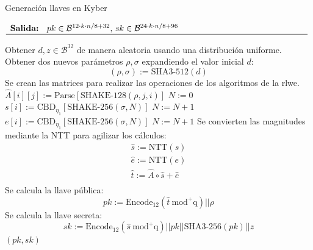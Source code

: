 \begin{algorithm}[H]
	\caption{Generación llaves en Kyber}
	$\begin{array}{p{\textwidth}}
		\textbf{Salida: } \(pk\in \mathcal{B}^{12\cdot k\cdot n/8+32}\), \(sk\in \mathcal{B}^{24\cdot k\cdot n/8+96}\) \\ 
		\hline
	\end{array}$
	\begin{algorithmic}[1]
		\State Obtener \(d, z\in\mathcal{B}^{32}\) de manera aleatoria usando una distribución uniforme.
		\State Obtener dos nuevos parámetros \(\rho, \sigma\) expandiendo el valor inicial \(d\):
		\begin{equation}
			(\rho, \sigma):=\text{SHA3-512}(d)
		\end{equation}
		\Statex Se crean las matrices para realizar las operaciones de los algoritmos de la  \acrshort{rlwe}.
				\State $\hat{A}[i][j]:=\text{Parse}[\text{SHAKE-128}(\rho,j,i)]$ 
			\EndFor
		\EndFor
		\State $N:=0$
			\State $s[i]:= \text{CBD}_{\eta_1}[\text{SHAKE-256}(\sigma,N)]$ 
			\State $N:= N+1$
		\EndFor
			\State $e[i]:= \text{CBD}_{\eta_1}[\text{SHAKE-256}(\sigma,N)]$ 
			\State $N:= N+1$
		\EndFor
		\State Se convierten las magnitudes mediante la NTT para agilizar los cálculos:
		\begin{equation}
				\begin{array}{l}
					\hat{s}:=\text{NTT}(s)\\
					\hat{e}:=\text{NTT}(e)\\
					\hat{t}:=\hat{A}\circ\hat{s}+\hat{e}\\
				\end{array} 	
		\end{equation}
		\State Se calcula la llave pública:
		\begin{equation}
			pk:=\text{Encode}_{12}(\hat{t}\ \text{mod}^{+}\text{q} )||\rho 
		\end{equation}
		\Statex {}
		\Statex {}
		\State Se calcula la llave secreta:
		\begin{equation}
			sk:=\text{Encode}_{12}(\hat{s}\ \text{mod}^{+}\text{q} )||pk||\text{SHA3-256}(pk)||z
		\end{equation}
		\Statex {}
		\State \Return $(pk,sk)$
	\end{algorithmic}
\end{algorithm}


